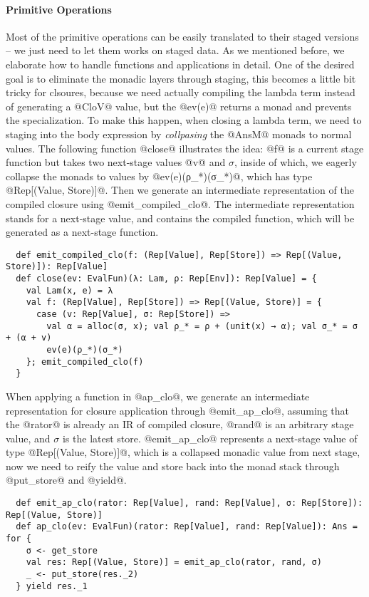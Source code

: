 \paragraph{Primitive Operations} Most of the primitive operations can be easily
translated to their staged versions -- we just need to let them works on staged data.
As we mentioned before, we elaborate how to handle functions and applications in
detail. One of the desired goal is to eliminate the monadic layers through
staging, this becomes a little bit tricky for clsoures, because we need actually
compiling the lambda term instead of generating a @CloV@ value, but the @ev(e)@
returns a monad and prevents the specialization. To make this happen, when
closing a lambda term, we need to staging into the body expression by
\textit{collpasing} the @AnsM@ monads to normal values. The
following function @close@ illustrates the idea: @f@ is a current stage function
but takes two next-stage values @v@ and $\sigma$, inside of which, we eagerly
collapse the monads to values by @ev(e)(ρ_*)(σ_*)@, which has type
@Rep[(Value, Store)]@. Then we generate an intermediate representation of the compiled
closure using @emit_compiled_clo@. The intermediate representation stands for a
next-stage value, and contains the compiled function, which will be generated as
a next-stage function.

\begin{lstlisting}
  def emit_compiled_clo(f: (Rep[Value], Rep[Store]) => Rep[(Value, Store)]): Rep[Value]
  def close(ev: EvalFun)(λ: Lam, ρ: Rep[Env]): Rep[Value] = {
    val Lam(x, e) = λ
    val f: (Rep[Value], Rep[Store]) => Rep[(Value, Store)] = {
      case (v: Rep[Value], σ: Rep[Store]) =>
        val α = alloc(σ, x); val ρ_* = ρ + (unit(x) → α); val σ_* = σ + (α + v)
        ev(e)(ρ_*)(σ_*)
    }; emit_compiled_clo(f)
  }
\end{lstlisting}

When applying a function in @ap_clo@, we generate an intermediate representation
for closure application through @emit_ap_clo@, assuming that the @rator@ is already an
IR of compiled closure, @rand@ is an arbitrary stage value, and $\sigma$ is the
latest store. @emit_ap_clo@ represents a next-stage value of type
@Rep[(Value, Store)]@, which is a collapsed monadic value from next stage, now
we need to reify the value and store back into the monad stack through
@put_store@ and @yield@.

\begin{lstlisting}
  def emit_ap_clo(rator: Rep[Value], rand: Rep[Value], σ: Rep[Store]): Rep[(Value, Store)]
  def ap_clo(ev: EvalFun)(rator: Rep[Value], rand: Rep[Value]): Ans = for {
    σ <- get_store
    val res: Rep[(Value, Store)] = emit_ap_clo(rator, rand, σ)
    _ <- put_store(res._2)
  } yield res._1
\end{lstlisting}

